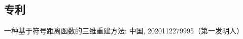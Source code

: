 
\begin{resume}




  \subsection*{专利}

  \begin{achievements}
    \item 一种基于符号距离函数的三维重建方法: 中国, 2020112279995（第一发明人）
  \end{achievements}

\end{resume}
